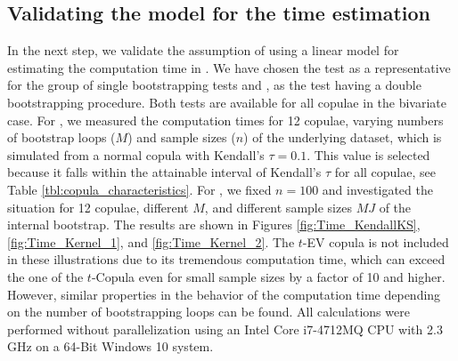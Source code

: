 \subsection{Validating the model for the time estimation}\label{subsec:Time_Validation}
In the next step, we validate the assumption of using a linear model for estimating the computation time in . \mycolor We have chosen the  test as a representative for the group of single bootstrapping tests and , as the test having a double bootstrapping procedure. Both tests are available for all copulae in the bivariate case. For , we measured the computation times for 12 copulae, varying numbers of bootstrap loops ($M$) and sample sizes ($n$) of the underlying dataset, which is simulated from a normal copula with Kendall's $\tau = 0.1$. This value is selected because it falls within the attainable interval of Kendall's $\tau$ for all copulae, see Table \ref{tbl:copula_characteristics}. For , we fixed $n = 100$ and investigated the situation for 12 copulae, different $M$, and different sample sizes $MJ$ of the internal bootstrap. The results are shown in Figures \ref{fig:Time_KendallKS}, \ref{fig:Time_Kernel_1}, and \ref{fig:Time_Kernel_2}. The $t$-EV copula is not included in these illustrations due to its tremendous computation time, which can exceed the one of the $t$-Copula even for small sample sizes by a factor of 10 and higher. However, similar properties in the behavior of the computation time depending on the number of bootstrapping loops can be found. All calculations were performed without parallelization using an Intel Core i7-4712MQ CPU with 2.3 GHz on a 64-Bit Windows 10 system.

